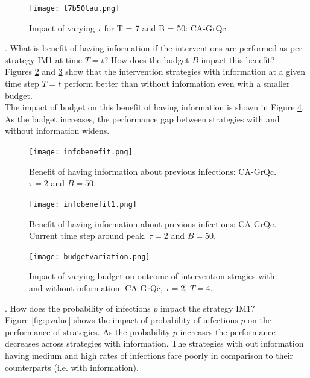 \begin{figure}[!h]
    \centering
    \texttt{[image: t7b50tau.png]}
    \caption{Impact of varying $\tau$ for T = 7 and B = 50: CA-GrQc}
    \label{fig:T7tau}
\end{figure}

. What is benefit of having information if the interventions are performed as per strategy IM1 at time $T = t$? How does the budget $B$ impact this benefit? \\

Figures \ref{fig:benefitGrQc} and \ref{fig:benefit1GrQc} show that the intervention strategies with information at a given time step $T = t$ perform better than without information even with a smaller budget. \\

The impact of budget on this benefit of having information is shown in Figure \ref{fig:budgetvariation}. As the budget increases, the performance gap between strategies with and without information widens.

\begin{figure}[!h]
    \centering
    \texttt{[image: infobenefit.png]}
    \caption{Benefit of having information about previous infections: CA-GrQc. $\tau =2$ and $B = 50$.}
    \label{fig:benefitGrQc}
\end{figure}

\begin{figure}[!h]
    \centering
    \texttt{[image: infobenefit1.png]}
    \caption{Benefit of having information about previous infections: CA-GrQc. Current time step around peak. $\tau =2$ and $B = 50$.}
    \label{fig:benefit1GrQc}
\end{figure}

\begin{figure}[!h]
    \centering
    \texttt{[image: budgetvariation.png]}
    \caption{Impact of varying budget on outcome of intervention stragies with and without information: CA-GrQc, $\tau = 2$, $T = 4$.}
    \label{fig:budgetvariation}
\end{figure}

. How does the probability of infections $p$ impact the strategy IM1? \\

Figure \ref{fig:pvalue} shows the impact of probability of infections $p$ on the performance of strategies. As the probability $p$ increases the performance decreases across strategies with information. The strategies with out information having medium and high rates of infections fare poorly in comparison to their counterparts (i.e. with information).

